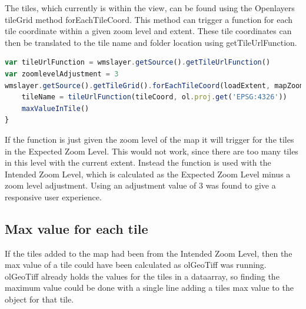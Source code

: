 The tiles, which currently is within the view, can be found using the Openlayers tileGrid method forEachTileCoord. This method can trigger a function for each tile coordinate within a given zoom level and extent. 
\citep{forEachTileCoord}
These tile coordinates can then be translated to the tile name and folder location using getTileUrlFunction.
\begin{lstlisting}[language=JavaScript, caption={}, label= VoresJS,escapechar=|]
var tileUrlFunction = wmslayer.getSource().getTileUrlFunction()
var zoomlevelAdjustment = 3
wmslayer.getSource().getTileGrid().forEachTileCoord(loadExtent, mapZoom - zoomlevelAdjustment, function(tileCoord) {
	tileName = tileUrlFunction(tileCoord, ol.proj.get('EPSG:4326'))
	maxValueInTile()
}
\end{lstlisting}
If the function is just given the zoom level of the map it will trigger for the tiles in the Expected Zoom Level. This would not work, since there are too many tiles in this level with the current extent. Instead the function is used with the Intended Zoom Level, which is calculated as the Expected Zoom Level minus a zoom level adjustment. Using an adjustment value of 3 was found to give a responsive user experience.


\subsection{Max value for each tile}
If the tiles added to the map had been from the Intended Zoom Level, then the max value of a tile could have been calculated as olGeoTiff was running. olGeoTiff already holds the values for the tiles in a dataarray, so finding the maximum value could be done with a single line adding a tiles max value to the object for that tile. %


